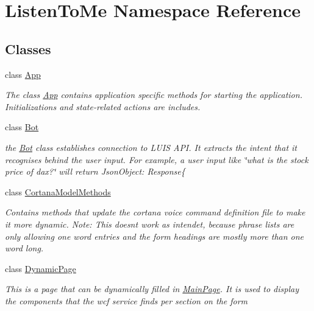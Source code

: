 \hypertarget{namespace_listen_to_me}{}\section{Listen\+To\+Me Namespace Reference}
\label{namespace_listen_to_me}
\subsection*{Classes}
\begin{DoxyCompactItemize}
\item 
class \hyperlink{class_listen_to_me_1_1_app}{App}
\begin{DoxyCompactList}\small\item\em The class \hyperlink{class_listen_to_me_1_1_app}{App} contains application specific methods for starting the application. Initializations and state-\/related actions are includes. \end{DoxyCompactList}\item 
class \hyperlink{class_listen_to_me_1_1_bot}{Bot}
\begin{DoxyCompactList}\small\item\em the \hyperlink{class_listen_to_me_1_1_bot}{Bot} class establishes connection to L\+U\+IS A\+PI. It extracts the intent that it recognises behind the user input. For example, a user input like \char`\"{}what is the stock price of dax?\char`\"{} will return Json\+Object\+: Response\{ \end{DoxyCompactList}\item 
class \hyperlink{class_listen_to_me_1_1_cortana_model_methods}{Cortana\+Model\+Methods}
\begin{DoxyCompactList}\small\item\em Contains methods that update the cortana voice command definition file to make it more dynamic. Note\+: This doesn\textquotesingle{}t work as intendet, because phrase lists are only allowing one word entries and the form headings are mostly more than one word long. \end{DoxyCompactList}\item 
class \hyperlink{class_listen_to_me_1_1_dynamic_page}{Dynamic\+Page}
\begin{DoxyCompactList}\small\item\em This is a page that can be dynamically filled in \hyperlink{class_listen_to_me_1_1_main_page}{Main\+Page}. It is used to display the components that the wcf service finds per section on the form \end{DoxyCompactList}\item 

\end{DoxyCompactItemize}
